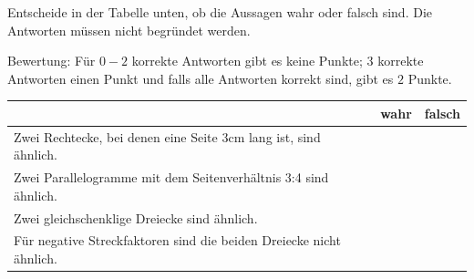 \documentclass[11pt]{exam}
\begin{document}
\begin{questions}
\question[2]
Entscheide in der Tabelle unten, ob die Aussagen wahr oder falsch sind. Die Antworten müssen nicht begründet werden.\newline
\begin{small}
    Bewertung: Für $0-2$ korrekte Antworten gibt es keine Punkte; $3$ korrekte Antworten einen Punkt und falls alle Antworten korrekt sind, gibt es $2$ Punkte.
\end{small}
\begingroup
\renewcommand{\arraystretch}{1.5}
\begin{table}[H]
    \centering
    \begin{tabular}{|p{12cm}|c|c|}\hline
         & wahr & falsch \\\hline
        Zwei Rechtecke, bei denen eine Seite $3$cm lang ist, sind ähnlich. & & \\\hline
        Zwei Parallelogramme mit dem Seitenverhältnis 3:4 sind ähnlich. & & \\\hline
        Zwei gleichschenklige Dreiecke sind ähnlich. & & \\\hline
        Für negative Streckfaktoren sind die beiden Dreiecke nicht ähnlich. & & \\\hline
    \end{tabular}
\end{table}
\endgroup

\end{questions}
\end{document}
